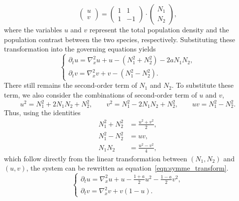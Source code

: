 \begin{equation}\label{eqn:linear_transform}
    \begin{pmatrix}
        u\\
        v
    \end{pmatrix}
    = \begin{pmatrix}
        1 & 1 \\
        1 & -1
    \end{pmatrix}
    \cdot
    \begin{pmatrix}
        N_1\\
        N_2
    \end{pmatrix},
\end{equation}
where the variables $u$ and $v$ represent the total population density and the population contrast between the two species, respectively. Substituting these transformation into the governing equations yields
\begin{equation*}
    \begin{cases}
        \partial_t u = \nabla_x^2 u + u - (N_1^2 + N_2^2) - 2a N_1 N_2,\\
        \partial_t v = \nabla_x^2 v + v - (N_1^2 - N_2^2).
    \end{cases}
\end{equation*}
There still remains the second-order term of $N_1$ and $N_2$. To substitute these term, we also consider the combinations of second-order term of $u$ and $v$,
\begin{equation*}
    u^2 = N_1^2 + 2N_1N_2 + N_2^2, \qquad
    v^2 = N_1^2 - 2N_1N_2 + N_2^2, \qquad
    uv = N_1^2 - N_2^2.
\end{equation*}
Thus, using the identities
\begin{align*}
    N_1^2 + N_2^2 &= \frac{u^2 + v^2}{2},\\
    N_1^2 - N_2^2 &= uv,\\
    N_1N_2 &= \frac{u^2 - v^2}{4},
\end{align*}
which follow directly from the linear transformation between $(N_1,N_2)$ and $(u,v)$, the system can be rewritten as equation~\ref{eqn:symme_transform}.
\begin{equation}
    \label{eqn:symme_transform}
    \begin{cases}
        \partial_t u
        = \nabla_x^2 u
        + u
        - \frac{1+a}{2}u^2
        - \frac{1-a}{2}v^2,\\
        \partial_t v
        = \nabla_x^2 v + v(1-u).
    \end{cases}
\end{equation}

